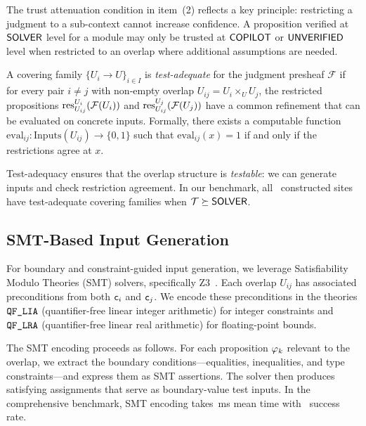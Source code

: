 \documentclass[11pt]{article}
\begin{document}
The trust attenuation condition in item~(2) reflects a key principle:
restricting a judgment to a sub-context cannot increase confidence.  A
proposition verified at $\mathsf{SOLVER}$ level for a module may only be trusted
at $\mathsf{COPILOT}$ or $\mathsf{UNVERIFIED}$ level when restricted to an overlap where
additional assumptions are needed.

\begin{definition}\label{def:test-adequate}
A covering family $\{U_i \to U\}_{i \in I}$ is \emph{test-adequate} for
the judgment presheaf $\mathcal{F}$ if for every pair $i \neq j$ with
non-empty overlap $U_{ij} = U_i \times_U U_j$, the restricted propositions
$\mathrm{res}_{U_{ij}}^{U_i}(\mathcal{F}(U_i))$ and
$\mathrm{res}_{U_{ij}}^{U_j}(\mathcal{F}(U_j))$ have a common refinement that
can be evaluated on concrete inputs.  Formally, there exists a computable
function $\mathrm{eval}_{ij} : \mathrm{Inputs}(U_{ij}) \to \{0,1\}$ such that
$\mathrm{eval}_{ij}(x) = 1$ if and only if the restrictions agree at $x$.
\end{definition}

Test-adequacy ensures that the overlap structure is \emph{testable}: we
can generate inputs and check restriction agreement.  In our benchmark,
all \compSiteTotalBuilt\ constructed sites have test-adequate covering
families when $\mathcal{T} \succeq \mathsf{SOLVER}$.

\subsection{SMT-Based Input Generation}\label{sec:smt-background}

For boundary and constraint-guided input generation, we leverage
Satisfiability Modulo Theories (SMT) solvers, specifically Z3~\cite{Z32008}.
Each overlap $U_{ij}$ has associated preconditions from both $\mathsf{c}_i$
and $\mathsf{c}_j$.  We encode these preconditions in the theories $\texttt{QF\_LIA}$
(quantifier-free linear integer arithmetic) for integer constraints and
$\texttt{QF\_LRA}$ (quantifier-free linear real arithmetic) for floating-point
bounds.

The SMT encoding proceeds as follows.  For each proposition $\varphi_k$
relevant to the overlap, we extract the boundary conditions---equalities,
inequalities, and type constraints---and express them as SMT assertions.
The solver then produces satisfying assignments that serve as boundary-value
test inputs.  In the comprehensive benchmark, SMT encoding takes
\compProfEncodeForSolverMeanMs\,ms mean time with
\compProfEncodeForSolverRate\ success rate.
\end{document}
